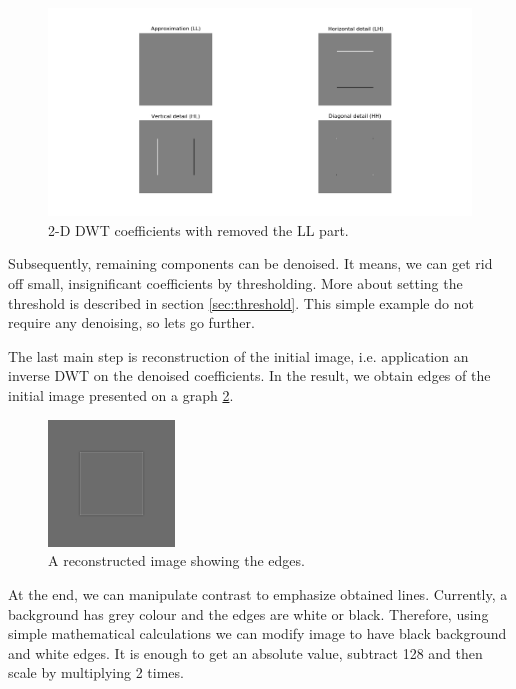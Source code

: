 \begin{figure}[h]
	\centering
	\includegraphics[width=\textwidth]{graphs/square_db2_coeffs_d.png}
	\caption{2-D DWT coefficients with removed the LL part.}
	\label{fig:square_coeffs_d}
\end{figure}

Subsequently, remaining components can be denoised. It means, we can get rid off small, insignificant coefficients by thresholding. More about setting the threshold is described in section \ref{sec:threshold}. This simple example do not require any denoising, so lets go further.

The last main step is reconstruction of the initial image, i.e. application an inverse DWT on the denoised coefficients. In the result, we obtain edges of the initial image presented on a graph \ref{fig:square_idwt}.

\begin{figure}[h]
	\centering
	\includegraphics[width=0.3\textwidth]{graphs/square_db2.png}
	\caption{A reconstructed image showing the edges.}
	\label{fig:square_idwt}
\end{figure}

At the end, we can manipulate contrast to emphasize obtained lines. Currently, a background has grey colour and the edges are white or black. Therefore, using simple mathematical calculations we can modify image to have black background and white edges. It is enough to get an absolute value, subtract 128 and then scale by multiplying 2 times.

